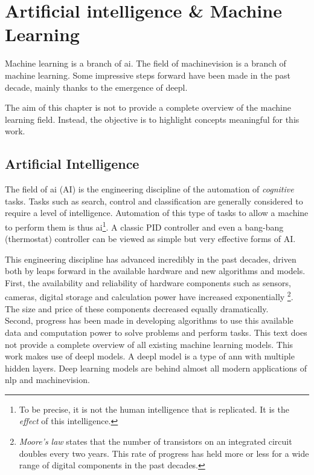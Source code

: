 \chapter{Artificial intelligence \& Machine Learning}

Machine learning is a branch of \Gls{ai}. 
The field of \Gls{machinevision} is a branch of machine learning.
  Some impressive steps forward have been made in the past decade, mainly thanks to the emergence of \Gls{deepl}.

The aim of this chapter is not to provide a complete overview of the machine learning field.
Instead, the objective is to highlight concepts meaningful for this work.

\section{Artificial Intelligence}

The field of \Gls{ai} (AI) is the engineering discipline of the automation of \textit{cognitive} tasks.
Tasks such as search, control and classification are generally considered to require a level of intelligence. 
Automation of this type of tasks to allow a machine to perform them is thus \Gls{ai}\footnote{To be precise, it is not the human intelligence that is replicated. It is the \textit{effect} of this intelligence.}.
A classic PID controller and even a bang-bang (thermostat) controller can be viewed as simple but very effective forms of AI.


This engineering discipline has advanced incredibly in the past decades, driven both by leaps forward in the available hardware and new algorithms and models. \\
First, the availability and reliability of hardware components such as sensors, cameras, digital storage and calculation power have increased exponentially 
\footnote{ \textit{Moore's law} states that the number of transistors on an integrated circuit doubles every two years. This rate of progress has held more or less for a wide range of digital components in the past decades.}.
The size and price of these components decreased equally dramatically. \\
Second, progress has been made in developing algorithms to use this available data and computation power to solve problems and perform tasks.
This text does not provide a complete overview of all existing machine learning models. 
This work makes use of \Gls{deepl} models.
A \Gls{deepl} model is a type of \acrfull{ann} with multiple hidden layers. 
Deep learning models are behind almost all modern applications of \acrfull{nlp} and \Gls{machinevision}.

